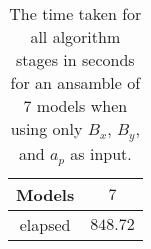 \begin{table}[!ht]
	\centering
	\begin{tabular}{|c|c|}
		\hline
		Models & $7$ \\ \hline
		elapsed & $848.72$ \\ \hline
	\end{tabular}
	\caption{The time taken for all algorithm stages in seconds for an ansamble of 7 models when using only $B_{x}$, $B_{y}$, and $a_{p}$ as input.}
	\label{tab:time:ansamble:reverse:xyap:7}
\end{table}
